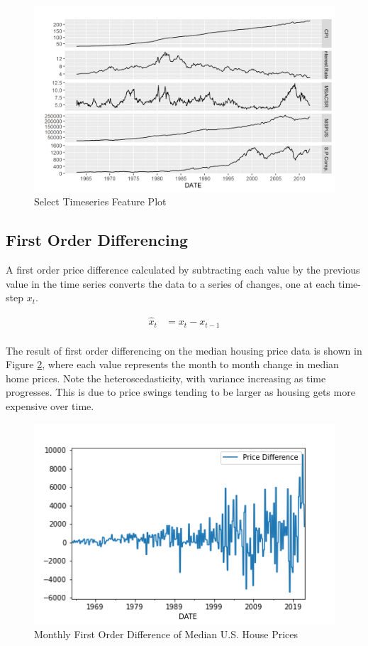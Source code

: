 \documentclass [MS] {uclathes}
\begin{document}
\begin{figure}[h!]
    \centering
    \includegraphics[scale=0.75]{figures/major_variables.png}
    \caption{Select Timeseries Feature Plot}
    \label{fig:major_variables}
\end{figure}


\subsection{First Order Differencing}

A first order price difference calculated by subtracting each value by the previous value in the time series converts the data to a series of changes, one at each time-step $x_t$. 

$$
\begin{aligned}
\hat{x}_{t} &= x_{t} - x_{t-1} \\
\end{aligned}
$$

The result of first order differencing on the median housing price data is shown in Figure \ref{fig:mspus_1st_difference}, where each value represents the month to month change in median home prices. Note the heteroscedasticity, with variance increasing as time progresses. This is due to price swings tending to be larger as housing gets more expensive over time. 

\begin{figure}[h!]
    \centering
    \includegraphics[scale=0.75]{figures/price_1st_difference.png}
    \caption{Monthly First Order Difference of Median U.S. House Prices}
    \label{fig:mspus_1st_difference}
\end{figure}
\end{document}
